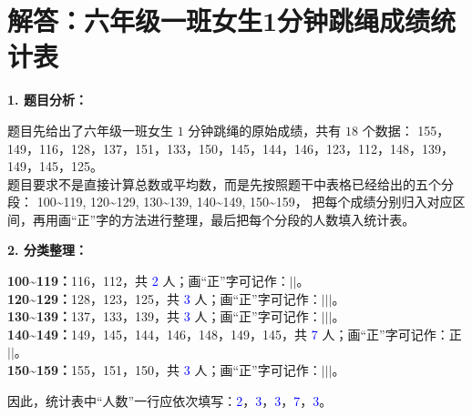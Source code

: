 

\section{解答：六年级一班女生1分钟跳绳成绩统计表}

\vspace{0.4cm}

\noindent\textbf{1. 题目分析：}

\vspace{0.2cm}

\noindent
题目先给出了六年级一班女生 $1$ 分钟跳绳的原始成绩，共有 $18$ 个数据：
155，149，116，128，137，151，133，150，145，144，146，123，112，148，139，149，145，125。\\[4pt]
题目要求不是直接计算总数或平均数，而是先按照题干中表格已经给出的五个分段：
100\textasciitilde119, 120\textasciitilde129, 130\textasciitilde139, 140\textasciitilde149, 150\textasciitilde159，
把每个成绩分别归入对应区间，再用画“正”字的方法进行整理，最后把每个分段的人数填入统计表。

\vspace{0.4cm}

\noindent\textbf{2. 分类整理：}

\vspace{0.2cm}

\noindent
\textbf{100\textasciitilde119：}116，112，共 \textcolor{blue}{2} 人；\quad 画“正”字可记作：$\vert\vert$。\\
\textbf{120\textasciitilde129：}128，123，125，共 \textcolor{blue}{3} 人；\quad 画“正”字可记作：$\vert\vert\vert$。\\
\textbf{130\textasciitilde139：}137，133，139，共 \textcolor{blue}{3} 人；\quad 画“正”字可记作：$\vert\vert\vert$。\\
\textbf{140\textasciitilde149：}149，145，144，146，148，149，145，共 \textcolor{blue}{7} 人；\quad 画“正”字可记作：正$\vert\vert$。\\
\textbf{150\textasciitilde159：}155，151，150，共 \textcolor{blue}{3} 人；\quad 画“正”字可记作：$\vert\vert\vert$。

\vspace{0.4cm}

\noindent
因此，统计表中“人数”一行应依次填写：\textcolor{blue}{2}，\textcolor{blue}{3}，\textcolor{blue}{3}，\textcolor{blue}{7}，\textcolor{blue}{3}。

